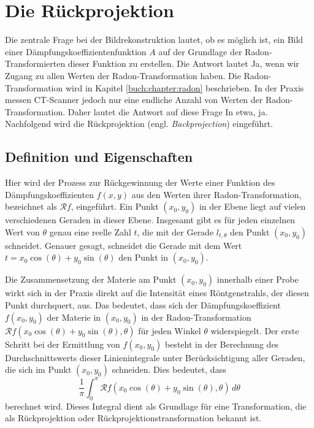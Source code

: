 %
%
%
%
\section{Die Rückprojektion
	\label{ct:section:ruekprojektion}}
Die zentrale Frage bei der Bildrekonstruktion lautet, ob es möglich ist, ein Bild einer Dämpfungskoeffizientenfunktion $A$ auf der Grundlage der Radon-Transformierten dieser Funktion zu erstellen. Die Antwort lautet \glqq Ja\grqq, wenn wir Zugang zu allen Werten der Radon-Transformation haben. Die Radon-Transformation wird in Kapitel \ref{buch:chapter:radon} beschrieben. In der Praxis messen CT-Scanner jedoch nur eine endliche Anzahl von Werten der Radon-Transformation. Daher lautet die Antwort auf diese Frage \glqq In etwa, ja\grqq. Nachfolgend wird die Rückprojektion (engl. \emph{Backprojection}) eingeführt.  
%
%

\subsection{Definition und Eigenschaften
	\label{ct:subsection:defnprop}}
Hier wird der Prozess zur Rückgewinnung der Werte einer Funktion des Dämpfungskoeffizienten $f(x, y)$ aus den Werten ihrer Radon-Transformation, bezeichnet als $\mathscr{R}f$, eingeführt. Ein Punkt $(x_0, y_0)$ in der Ebene liegt auf vielen verschiedenen Geraden in dieser Ebene. Insgesamt gibt es für jeden einzelnen Wert von $\theta$ genau eine reelle Zahl $t$, die mit der Gerade $l_{t,\theta}$ den Punkt $(x_0, y_0)$ schneidet. Genauer gesagt, schneidet die Gerade mit dem Wert $t = x_0\cos(\theta) + y_0\sin(\theta)$ den Punkt in $(x_0, y_0)$.  

Die Zusammensetzung der Materie am Punkt $(x_0, y_0)$ innerhalb einer Probe wirkt sich in der Praxis direkt auf die Intensität eines Röntgenstrahls, der diesen Punkt durchquert, aus. Das bedeutet, dass sich der Dämpfungskoeffizient $f(x_0, y_0)$ der Materie in $(x_0, y_0)$ in der Radon-Transformation $\mathscr{R}f(x_0\cos(\theta) + y_0\sin(\theta), \theta)$ für jeden Winkel $\theta$ widerspiegelt. Der erste Schritt bei der Ermittlung von $f(x_0, y_0)$ besteht in der Berechnung des Durchschnittswerts dieser Linienintegrale unter Berücksichtigung aller Geraden, die sich im Punkt $(x_0, y_0)$ schneiden. Dies bedeutet, dass
\begin{equation}
	\dfrac{1}{\pi}\int_{0}^{\pi} \mathscr{R}f(x_0\cos(\theta) + y_0\sin(\theta), \theta) \,d\theta
\end{equation}
berechnet wird. Dieses Integral dient als Grundlage für eine Transformation, die als Rückprojektion oder Rückprojektionstransformation bekannt ist.

